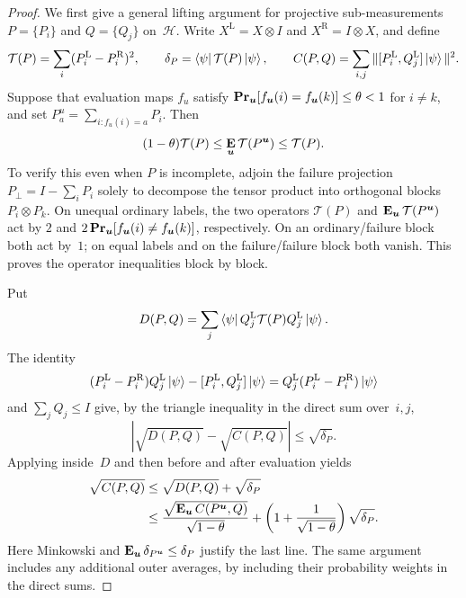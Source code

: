 \documentclass[11pt]{article}
\theoremstyle{definition}
\renewcommand{\Pr}{\mathop{\bf Pr\/}}
\newcommand{\E}{\mathop{\bf E\/}}
\newcommand{\calH}{\mathcal{H}}
\newcommand{\bu}{\boldsymbol{u}}
\begin{document}
\begin{proof}
We first give a general lifting argument for projective
sub-measurements $P=\{P_i\}$ and $Q=\{Q_j\}$ on~$\calH$.
Write $X^{\mathrm L}=X\otimes I$ and
$X^{\mathrm R}=I\otimes X$, and define
\[
 \mathcal T(P)=\sum_i(P_i^{\mathrm L}-P_i^{\mathrm R})^2,
 \qquad \delta_P=\bra\psi\mathcal T(P)\ket\psi,
 \qquad
 C(P,Q)=\sum_{i,j}\|[P_i^{\mathrm L},Q_j^{\mathrm L}]\ket\psi\|^2.
\]
Suppose that evaluation maps $f_u$ satisfy
$\Pr_{\bu}[f_{\bu}(i)=f_{\bu}(k)]\leq\theta<1$ for $i\ne k$,
and set $P^u_a=\sum_{i:f_u(i)=a}P_i$.  Then
\begin{equation}\label{eq:commutation-disagreement-operator}
 (1-\theta)\mathcal T(P)
 \leq\E_{\bu}\mathcal T(P^{\bu})\leq\mathcal T(P).
\end{equation}
To verify this even when $P$ is incomplete, adjoin the failure
projection $P_\perp=I-\sum_iP_i$ solely to decompose the tensor
product into orthogonal blocks $P_i\otimes P_k$.
On unequal ordinary labels, the two operators
$\mathcal T(P)$ and $\E_{\bu}\mathcal T(P^{\bu})$ act by
$2$ and $2\Pr_{\bu}[f_{\bu}(i)\ne f_{\bu}(k)]$, respectively.
On an ordinary/failure block both act by~$1$; on equal labels and
on the failure/failure block both vanish.  This proves the operator
inequalities block by block.

Put
\[
 D(P,Q)=\sum_j\bra\psi Q_j^{\mathrm L}
                   \mathcal T(P)Q_j^{\mathrm L}\ket\psi.
\]
The identity
\[
 (P_i^{\mathrm L}-P_i^{\mathrm R})Q_j^{\mathrm L}\ket\psi
 -[P_i^{\mathrm L},Q_j^{\mathrm L}]\ket\psi
 =Q_j^{\mathrm L}(P_i^{\mathrm L}-P_i^{\mathrm R})\ket\psi
\]
and $\sum_jQ_j\leq I$ give, by the triangle inequality in the
direct sum over~$i,j$,
\begin{equation}\label{eq:commutation-mirror-comparison}
 |\sqrt{D(P,Q)}-\sqrt{C(P,Q)}|\leq\sqrt{\delta_P}.
\end{equation}
Applying  inside~$D$
and then  before and after
evaluation yields
\begin{align}
 \sqrt{C(P,Q)}
 &\leq\sqrt{D(P,Q)}+\sqrt{\delta_P}\nonumber\\
 &\leq\frac{\sqrt{\E_{\bu}C(P^{\bu},Q)}}{\sqrt{1-\theta}}
  +\left(1+\frac1{\sqrt{1-\theta}}\right)\sqrt{\delta_P}.
 \label{eq:commutation-one-sided-lifting}
\end{align}
Here Minkowski and
$\E_{\bu}\delta_{P^{\bu}}\leq\delta_P$ justify the last line.
The same argument includes any additional outer averages, by
including their probability weights in the direct sums.


\end{proof}
\end{document}
